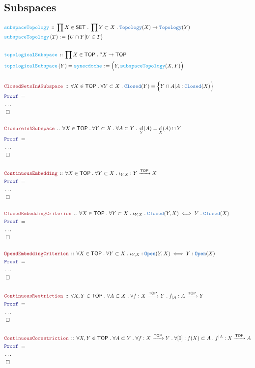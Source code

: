 \documentclass[12pt]{scrartcl}
\newcommand{\TYPE}[1]{\textcolor{NavyBlue}{\mathtt{#1}}}
\newcommand{\FUNC}[1]{\textcolor{Cerulean}{\mathtt{#1}}}
\newcommand{\LOGIC}[1]{\textcolor{Blue}{\mathtt{#1}}}
\newcommand{\THM}[1]{\textcolor{Maroon}{\mathtt{#1}}}
\renewcommand{\.}{\; . \;}
\newcommand{\de}{: \kern 0.1pc =}
\newcommand{\Act}[1]{\left( #1 \right)}
\newcommand{\Theorem}[2]{& \THM{#1} \, :: \, #2 \\ & \Proof = \\ }
\newcommand{\DeclareFunc}[2]{& \FUNC{#1} \, :: \, #2 \\}
\newcommand{\DefineFunc}[3]{&  \FUNC{#1}\Act{#2} \de #3 \\}
\newcommand{\DefineNamedFunc}[4]{&  \FUNC{#1}\Act{#2} = #3 \de #4 \\}
\newcommand{\Page}[1]{ \begin{align*} #1 \end{align*}   }
\newcommand{\NoProof}{ & \ldots \\ \EndProof}
\newcommand{\Arrow}{\xrightarrow}
\newcommand{\QED}{\; \square}
\newcommand{\EndProof}{& \QED \\}
\newcommand{\Proof}{\LOGIC{Proof} \; }
\newcommand{\SET}{\mathsf{SET}}
\DeclareMathOperator*{\cl}{cl}
\newcommand{\TOP}{\mathsf{TOP}}
\begin{document}
\subsection{Subspaces}
\Page{
	\DeclareFunc{subspaceTopology}{\prod X \in \SET \. \prod Y \subset X \. \TYPE{Topology}(X) \to \TYPE{Topology}(Y)}
	\DefineFunc{subspaceTopology}{T}{\{ U \cap Y | U \in T  \}}
	\\
	\DeclareFunc{topologicalSubspace}{\prod X \in \TOP \. ?X \to \TOP}
	\DefineNamedFunc{topologicalSubspace}{Y}{\FUNC{synecdoche}}{ \Big( Y, \FUNC{subspaceTopology}(X,Y)\Big) }
	\\
	\Theorem{ClosedSetsInASubspace}
	{
		\forall X \in \TOP \.
		\forall Y \subset X \.
		\TYPE{Closed}(Y) = \Big\{ Y \cap A | A : \TYPE{Closed}(X)  \Big\}
	}
	\NoProof
	\\
	\Theorem{ClosureInASubspace}
	{
		\forall X \in \TOP \.
		\forall Y \subset X \.
		\forall A \subset Y \. 
		\cl_Y(A) = \cl_X(A) \cap Y
	}
	\NoProof
	\\
	\Theorem{ContinuousEmbedding}
	{
		\forall X \in \TOP \.
		\forall Y \subset X \.
		\iota_{Y,X} : Y \Arrow{\TOP} X
	}
	\NoProof
	\\
	\Theorem{ClosedEmbeddingCriterion}
	{
		\forall X \in \TOP \.
		\forall Y \subset X \.
		\iota_{Y,X} : \TYPE{Closed}(Y,X) \iff
		Y : \TYPE{Closed}(X)
	}
	\NoProof
	\\
	\Theorem{OpendEmbeddingCriterion}
	{
		\forall X \in \TOP \.
		\forall Y \subset X \.
		\iota_{Y,X} : \TYPE{Open}(Y,X) \iff
		Y : \TYPE{Open}(X)
	}
	\NoProof
	\\
	\Theorem{ContinuousRestriction}
	{
		\forall X,Y \in \TOP \.
		\forall A \subset X \.
		\forall f : X \Arrow{\TOP} Y \.
		f_{|A} : A \Arrow{\TOP} Y
	}
	\NoProof
	\\
	\Theorem{ContinuousCorestriction}
	{
		\forall X,Y \in \TOP \.
		\forall  A \subset Y \.
		\forall f : X \Arrow{\TOP} Y \.
		\forall [0] : f(X) \subset A \.
		f^{|A} : X \Arrow{\TOP} A
	}
	\NoProof
}
\end{document}

